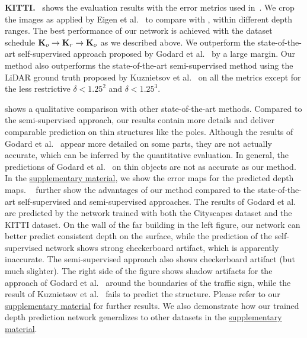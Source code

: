 \documentclass[runningheads]{llncs}
\begin{document}
\textbf{KITTI.}~ 
shows the evaluation results with the error 
metrics used in~\cite{eigen2014depth}. We 
crop the images as applied by Eigen et al.~\cite{eigen2014depth} to compare 
with \cite{godard2016unsupervised}, \cite{kuznietsov2017semi} within different 
depth ranges.
The best performance of our network is achieved 
with the dataset schedule 
$\text{\textbf{K}}_o 
\rightarrow 
\text{\textbf{K}}_r \rightarrow 
\text{\textbf{K}}_o $ as we described above. 
We outperform the state-of-the-art 
self-supervised approach 
proposed by Godard et 
al.~\cite{godard2016unsupervised} by a large 
margin.
Our method also 
outperforms the state-of-the-art semi-supervised method using 
the LiDAR ground truth proposed by 
Kuznietsov et al.~\cite{kuznietsov2017semi} 
on all the metrics except for the less restrictive $\delta < 
1.25^2$ and $\delta < 1.25^3$. 

shows a qualitative comparison with other 
state-of-the-art methods. Compared to the 
semi-supervised approach, 
our results contain more details and deliver
comparable prediction on thin structures like the poles.
Although the results of Godard et 
al.~\cite{godard2016unsupervised} 
appear more detailed on some parts, they are 
not actually accurate, which can be inferred by the quantitative 
evaluation. In general, the predictions of Godard et 
al.~\cite{godard2016unsupervised} on 
thin objects are not as accurate as our method. In the 
\href{https://vision.in.tum.de/_media/spezial/bib/yang2018dvso-supp.pdf}{supplementary
	material}, we show the error
maps for the predicted depth maps.
~ further show 
the advantages of our method compared to the 
state-of-the-art self-supervised and semi-supervised
approaches. The results of Godard et 
al.~\cite{godard2016unsupervised} are 
predicted by the network trained with both 
the Cityscapes dataset and the KITTI dataset.
On the wall of the far building 
in the left figure, our network can 
better predict consistent depth on the 
surface, while the prediction of the 
self-supervised network shows strong checkerboard 
artifact, which is apparently inaccurate. The 
semi-supervised approach also shows checkerboard artifact (but much slighter). 
The right side of the figure shows shadow artifacts for the approach of Godard et al.~\cite{godard2016unsupervised} around the boundaries of the traffic 
sign, while the result of Kuznietsov et al.~\cite{kuznietsov2017semi} fails to predict the structure. 
Please refer to our 
\href{https://vision.in.tum.de/_media/spezial/bib/yang2018dvso-supp.pdf}{supplementary
	material} for further results.
We also demonstrate how our trained depth prediction network generalizes to 
other datasets in the 
\href{https://vision.in.tum.de/_media/spezial/bib/yang2018dvso-supp.pdf}{supplementary
	material}.
\end{document}
